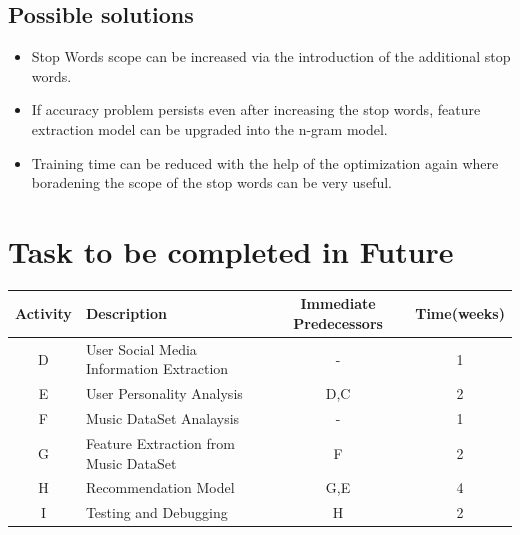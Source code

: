 \documentclass[a4paper, 12pt, onepage]{article}
\begin{document}
      \subsection{Possible solutions}
      \begin{itemize}
	\item Stop Words scope can be increased via the introduction of the additional stop words.
	\item If accuracy problem persists even after increasing the stop words, feature extraction model can be upgraded into the n-gram model.
	\item Training time can be reduced with the help of the optimization again where boradening the scope of the stop words can be very useful.
	\end{itemize}
      \clearpage
      \section{Task to be completed in Future}
	\begin{center}
		\begin{tabular}{|c|l|c|c|}
			\hline
				Activity & Description & Immediate Predecessors&Time(weeks)\\
			\hline
			D&User Social Media Information Extraction&-&1\\
			\hline
			E&User Personality Analysis&D,C&2\\
			\hline
			F&Music DataSet Analaysis&-&1 \\
			\hline
			G&Feature Extraction from Music DataSet&F&2\\
			\hline
			H&Recommendation Model&G,E&4\\
			\hline
			I&Testing and Debugging&H&2\\
			\hline
		\end{tabular}
	\end{center}
\end{document}
